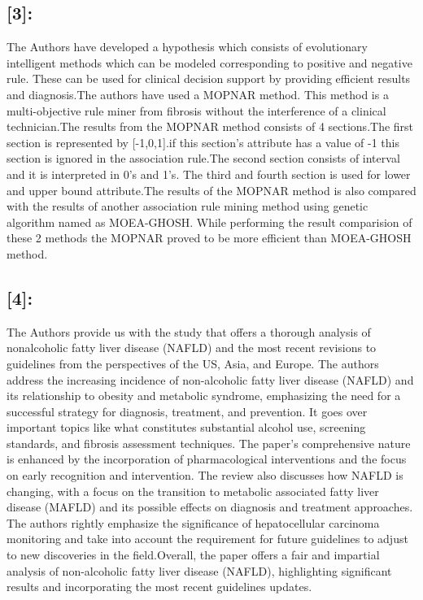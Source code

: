 \documentclass{article}
\begin{document}
\begin{multicols}{2}
\subsection{[3]:}
    The Authors have developed a hypothesis which consists of evolutionary intelligent methods which can be modeled corresponding to positive and negative rule. These can be used for clinical decision support by providing efficient results and diagnosis.The authors have used a MOPNAR method. This method is a multi-objective rule miner from fibrosis without the interference of a clinical technician.The results from the MOPNAR method consists of 4 sections.The first section is represented by [-1,0,1].if this section's attribute has a value of -1 this section is ignored in the association rule.The second section consists of interval and it is interpreted in 0's and 1's. The third and fourth section is used for lower and upper bound attribute.The results of the MOPNAR method is also compared with the results of another association rule mining method using genetic algorithm named as MOEA-GHOSH. While performing the result comparision of these 2 methods the MOPNAR proved to be more efficient than MOEA-GHOSH method. 
\vspace{5pt}
\vspace{5pt}
\subsection{[4]:}
    The Authors provide us with the study that offers a thorough analysis of nonalcoholic fatty liver disease (NAFLD) and the most recent revisions to guidelines from the perspectives of the US, Asia, and Europe. The authors address the increasing incidence of non-alcoholic fatty liver disease (NAFLD) and its relationship to obesity and metabolic syndrome, emphasizing the need for a successful strategy for diagnosis, treatment, and prevention. It goes over important topics like what constitutes substantial alcohol use, screening standards, and fibrosis assessment techniques. The paper's comprehensive nature is enhanced by the incorporation of pharmacological interventions and the focus on early recognition and intervention.
    The review also discusses how NAFLD is changing, with a focus on the transition to metabolic associated fatty liver disease (MAFLD) and its possible effects on diagnosis and treatment approaches. The authors rightly emphasize the significance of hepatocellular carcinoma monitoring and take into account the requirement for future guidelines to adjust to new discoveries in the field.Overall, the paper offers a fair and impartial analysis of non-alcoholic fatty liver disease (NAFLD), highlighting significant results and incorporating the most recent guidelines updates.

\end{multicols}
\end{document}

